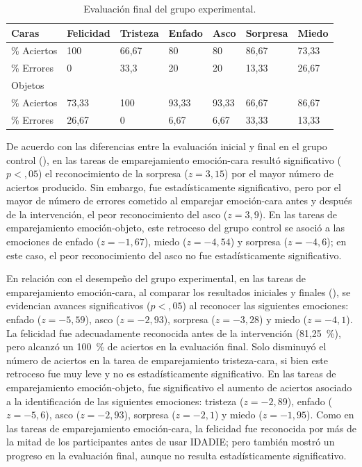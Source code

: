 \documentclass[spanish]{textolivre}
\begin{document}
\begin{table}[h!]
\centering
\begin{threeparttable}
\caption{Evaluación final del grupo experimental.}
\label{tab04}
\begin{tabular}{l l l l l l l}
\toprule
 Caras & Felicidad & Tristeza & Enfado & Asco & Sorpresa & Miedo \\
 \midrule
\% Aciertos & 100 & 66,67 & 80 & 80 & 86,67 & 73,33 \\
\% Errores & 0 & 33,3 & 20 & 20 & 13,33 & 26,67 \\
Objetos & & & & & & \\
\% Aciertos & 73,33 & 100 & 93,33 & 93,33 & 66,67 & 86,67 \\
\% Errores & 26,67 & 0 & 6,67 & 6,67 & 33,33 & 13,33 \\
\bottomrule
\end{tabular}
\end{threeparttable}
\end{table}

De acuerdo con las diferencias entre la evaluación inicial y final en el grupo control (), en las tareas de emparejamiento emoción-cara resultó significativo ($p < ,05$) el reconocimiento de la sorpresa ($z = 3,15$) por el mayor número de aciertos producido. Sin embargo, fue estadísticamente significativo, pero por el mayor de número de errores cometido al emparejar emoción-cara antes y después de la intervención, el peor reconocimiento del asco ($z = 3,9$). En las tareas de emparejamiento emoción-objeto, este retroceso del grupo control se asoció a las emociones de enfado ($z = -1,67$), miedo ($z = -4,54$) y sorpresa ($z = -4,6$); en este caso, el peor reconocimiento del asco no fue estadísticamente significativo. 

En relación con el desempeño del grupo experimental, en las tareas de emparejamiento emoción-cara, al comparar los resultados iniciales y finales (), se evidencian avances significativos ($p < ,05$) al reconocer las siguientes emociones: enfado ($z = -5,59$), asco ($z = -2,93$), sorpresa ($z = -3,28$) y miedo ($z = -4,1$). La felicidad fue adecuadamente reconocida antes de la intervención (81,25~\%), pero alcanzó un 100~\% de aciertos en la evaluación final. Solo disminuyó el número de aciertos en la tarea de emparejamiento tristeza-cara, si bien este retroceso fue muy leve y no es estadísticamente significativo. En las tareas de emparejamiento emoción-objeto, fue significativo el aumento de aciertos asociado a la identificación de las siguientes emociones: tristeza ($z = -2,89$), enfado ($z = -5,6$), asco ($z = -2,93$), sorpresa ($z = -2,1$) y miedo ($z = -1,95$). Como en las tareas de emparejamiento emoción-cara, la felicidad fue reconocida por más de la mitad de los participantes antes de usar IDADIE; pero también mostró un progreso en la evaluación final, aunque no resulta estadísticamente significativo.
\end{document}
